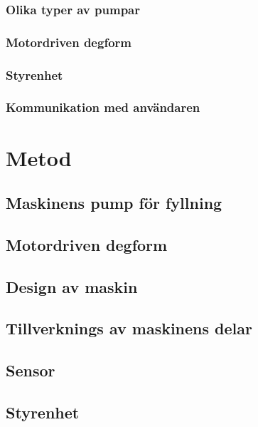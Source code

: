\documentclass[11pt,a4paper,oneside]{book}
\begin{document}
\subsection{Olika typer av pumpar}
 
\newpage
\subsection{Motordriven degform}

\subsection{Styrenhet}

\subsection{Kommunikation med användaren}


\chapter{Metod}

\section{Maskinens pump för fyllning}

\section{Motordriven degform}

\section{Design av maskin}

\section{Tillverknings av maskinens delar}

\section{Sensor}

\section{Styrenhet}

\end{document}
